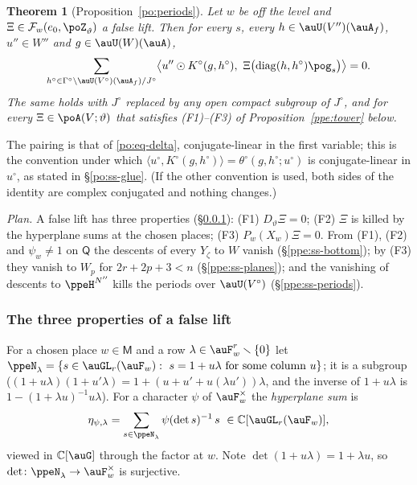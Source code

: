 \documentclass[10pt]{amsart}
\newtheorem{theorem}{Theorem}[section]
\theoremstyle{definition}
\theoremstyle{remark}
\newcommand{\C}{\mathbb C}
\begin{document}
\begin{theorem}[Proposition~\ref{po:periods}]\label{ppe:main}
Let $w$ be off the level and $\Xi\in\mathcal F_w(e_0,\poZ_\vartheta)$ a false lift. Then for every
$s$, every $h\in\auU(V'')(\auA_f)$, $u''\in W''$ and $g\in\auU(W)(\auA)$,
\[
\sum_{h^\circ\in\Gamma^\circ\backslash\auU(V^\circ)(\auA_f)/J^\circ}\bigl\langle u''\odot
K^\circ(g,h^\circ),\ \Xi\bigl(\operatorname{diag}(h,h^\circ)\pog_s\bigr)\bigr\rangle=0 .
\]
The same holds with $J^\circ$ replaced by any open compact subgroup of $J^\circ$, and for every
$\Xi\in\poA(V;\vartheta)$ that satisfies (F1)--(F3) of Proposition~\ref{ppe:tower} below.
\end{theorem}

The pairing is that of \eqref{po:eq-delta}, conjugate-linear in the first variable; this is the
convention under which $\langle u^\circ,K^\circ(g,h^\circ)\rangle=\theta^\circ(g,h^\circ;u^\circ)$
is conjugate-linear in $u^\circ$, as stated in \S\ref{po:ss-glue}. (If the other convention is
used, both sides of the identity are complex conjugated and nothing changes.)

\emph{Plan.} A false lift has three properties (\S\ref{ppe:ss-three}): (F1) $D_\vartheta\Xi=0$;
(F2) $\Xi$ is killed by the hyperplane sums at the chosen places; (F3) $P_w(X_w)\Xi=0$.
From (F1), (F2) and $\psi_w\ne1$ on $\mathsf Q$ the descents of every $Y_\zeta$ to $W$ vanish
(\S\ref{ppe:ss-bottom}); by (F3) they vanish to $W_p$ for $2r+2p+3<n$
(\S\ref{ppe:ss-planes}); and the vanishing of descents to $\ppeH^{N''}$ kills the periods over
$\auU(V^\circ)$ (\S\ref{ppe:ss-periods}).

\subsubsection{The three properties of a false lift}\label{ppe:ss-three}

For a chosen place $w\in\mathsf M$ and a row $\lambda\in\auF_w^r\smallsetminus\{0\}$ let
$\ppeN_\lambda=\{s\in\auGL_r(\auF_w):\ s=1+u\lambda\text{ for some column }u\}$; it is a subgroup
($(1+u\lambda)(1+u'\lambda)=1+(u+u'+u(\lambda u'))\lambda$, and the inverse of $1+u\lambda$ is
$1-(1+\lambda u)^{-1}u\lambda$). For a character $\psi$ of $\auF_w^\times$ the \emph{hyperplane
sum} is
\[
\eta_{\psi,\lambda}=\sum_{s\in\ppeN_\lambda}\psi(\det s)^{-1}\,s\ \in\C[\auGL_r(\auF_w)],
\]
viewed in $\C[\auG]$ through the factor at $w$. Note $\det(1+u\lambda)=1+\lambda u$, so
$\det\colon\ppeN_\lambda\to\auF_w^\times$ is surjective.
\end{document}
